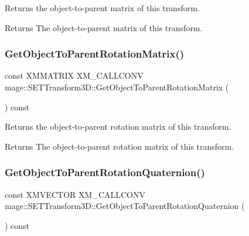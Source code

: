Returns the object-\/to-\/parent matrix of this transform.

\begin{DoxyReturn}{Returns}
The object-\/to-\/parent matrix of this transform. 
\end{DoxyReturn}
\mbox{\label{classmage_1_1_s_e_t_transform3_d_ab6cc8c2dcc450b64d19f21bb319530a0}} 
\subsubsection{\texorpdfstring{Get\+Object\+To\+Parent\+Rotation\+Matrix()}{GetObjectToParentRotationMatrix()}}
{\footnotesize\ttfamily const X\+M\+M\+A\+T\+R\+IX X\+M\+\_\+\+C\+A\+L\+L\+C\+O\+NV mage\+::\+S\+E\+T\+Transform3\+D\+::\+Get\+Object\+To\+Parent\+Rotation\+Matrix (\begin{DoxyParamCaption}{ }\end{DoxyParamCaption}) const\hspace{0.3cm}{\ttfamily [noexcept]}}

Returns the object-\/to-\/parent rotation matrix of this transform.

\begin{DoxyReturn}{Returns}
The object-\/to-\/parent rotation matrix of this transform. 
\end{DoxyReturn}
\mbox{\label{classmage_1_1_s_e_t_transform3_d_a5853b2bcc7ae145c1898db8d91f9c67a}} 
\subsubsection{\texorpdfstring{Get\+Object\+To\+Parent\+Rotation\+Quaternion()}{GetObjectToParentRotationQuaternion()}}
{\footnotesize\ttfamily const X\+M\+V\+E\+C\+T\+OR X\+M\+\_\+\+C\+A\+L\+L\+C\+O\+NV mage\+::\+S\+E\+T\+Transform3\+D\+::\+Get\+Object\+To\+Parent\+Rotation\+Quaternion (\begin{DoxyParamCaption}{ }\end{DoxyParamCaption}) const\hspace{0.3cm}{\ttfamily [noexcept]}}

